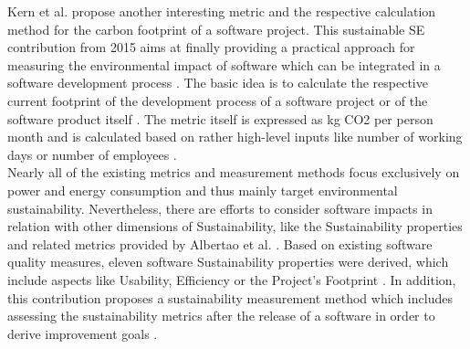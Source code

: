 \documentclass[oribibl]{llncs}
\begin{document}
Kern et al. \cite{kern_impacts_2015} propose another interesting metric and the respective calculation method for the carbon footprint of a software project. This sustainable SE contribution from 2015 aims at finally providing a practical approach for measuring the environmental impact of software which can be integrated in a software development process \cite{kern_impacts_2015}. The basic idea is to calculate the respective current footprint of the development process of a software project or of the software product itself \cite{kern_impacts_2015}. The metric itself is expressed as kg CO2 %
per person month and is calculated based on rather high-level inputs like number of working days or number of employees \cite{kern_impacts_2015}.\\
Nearly all of the existing metrics and measurement methods focus exclusively on power and energy consumption and thus mainly target environmental sustainability. %
Nevertheless, there are efforts to consider software impacts in relation with other dimensions of Sustainability, like the Sustainability properties and related metrics provided by Albertao et al. \cite{albertao_measuring_2010}. 
Based on existing software quality measures, eleven software Sustainability properties were derived, which include aspects like Usability, Efficiency or the Project's Footprint \cite{albertao_measuring_2010}. 
In addition, this contribution proposes a sustainability measurement method which includes assessing the sustainability metrics after the release of a software in order to derive improvement goals \cite{albertao_measuring_2010}.


\end{document}
